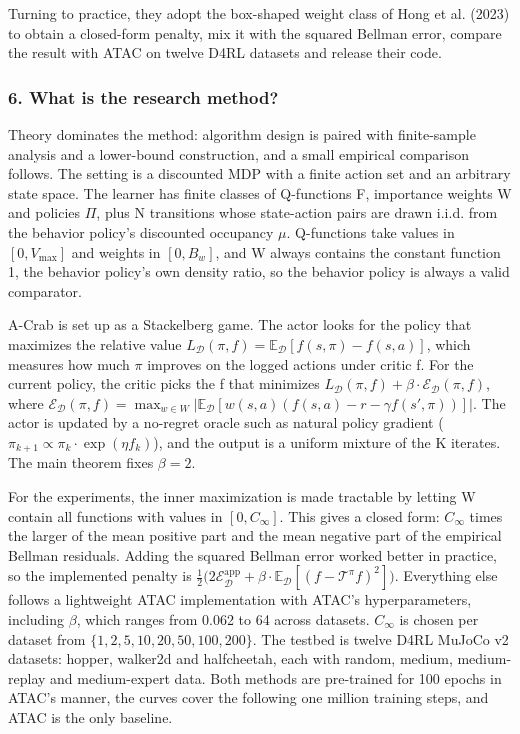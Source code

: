 \documentclass[11pt]{article}
\newcommand{\question}[1]{\subsubsection*{#1}}
\begin{document}
Turning to practice, they adopt the box-shaped weight class of Hong et al. (2023) to obtain a closed-form penalty, mix it with the squared Bellman error, compare the result with ATAC on twelve D4RL datasets and release their code.

\question{6. What is the research method?}

Theory dominates the method: algorithm design is paired with finite-sample analysis and a lower-bound construction, and a small empirical comparison follows. The setting is a discounted MDP with a finite action set and an arbitrary state space. The learner has finite classes of Q-functions F, importance weights W and policies \ensuremath{\Pi}, plus N transitions whose state-action pairs are drawn i.i.d. from the behavior policy's discounted occupancy \ensuremath{\mu}. Q-functions take values in $[0,V_{\max}]$ and weights in $[0,B_w]$, and W always contains the constant function 1, the behavior policy's own density ratio, so the behavior policy is always a valid comparator.

A-Crab is set up as a Stackelberg game. The actor looks for the policy that maximizes the relative value $L_{\mathcal{D}}(\pi,f)=\mathbb{E}_{\mathcal{D}}[f(s,\pi)-f(s,a)]$, which measures how much \ensuremath{\pi} improves on the logged actions under critic f. For the current policy, the critic picks the f that minimizes $L_{\mathcal{D}}(\pi,f)+\beta\cdot\mathcal{E}_{\mathcal{D}}(\pi,f)$, where $\mathcal{E}_{\mathcal{D}}(\pi,f)=\max_{w\in W}\big\lvert\mathbb{E}_{\mathcal{D}}[w(s,a)(f(s,a)-r-\gamma f(s',\pi))]\big\rvert$. The actor is updated by a no-regret oracle such as natural policy gradient ($\pi_{k+1}\propto\pi_k\cdot\exp(\eta f_k)$), and the output is a uniform mixture of the K iterates. The main theorem fixes $\beta=2$.

For the experiments, the inner maximization is made tractable by letting W contain all functions with values in $[0,C_\infty]$. This gives a closed form: $C_\infty$ times the larger of the mean positive part and the mean negative part of the empirical Bellman residuals. Adding the squared Bellman error worked better in practice, so the implemented penalty is $\tfrac{1}{2}\big(2\mathcal{E}_{\mathcal{D}}^{\mathrm{app}}+\beta\cdot\mathbb{E}_{\mathcal{D}}[(f-\mathcal{T}^{\pi}f)^{2}]\big)$. Everything else follows a lightweight ATAC implementation with ATAC's hyperparameters, including \ensuremath{\beta}, which ranges from 0.062 to 64 across datasets. $C_\infty$ is chosen per dataset from $\{1,2,5,10,20,50,100,200\}$. The testbed is twelve D4RL MuJoCo v2 datasets: hopper, walker2d and halfcheetah, each with random, medium, medium-replay and medium-expert data. Both methods are pre-trained for 100 epochs in ATAC's manner, the curves cover the following one million training steps, and ATAC is the only baseline.
\end{document}
